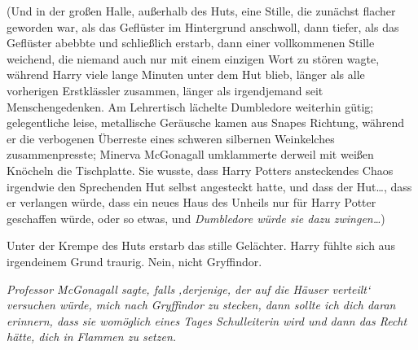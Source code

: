 (Und in der großen Halle, außerhalb des Huts, eine Stille, die zunächst flacher geworden war, als das Geflüster im Hintergrund anschwoll, dann tiefer, als das Geflüster abebbte und schließlich erstarb, dann einer vollkommenen Stille weichend, die niemand auch nur mit einem einzigen Wort zu stören wagte, während Harry viele lange Minuten unter dem Hut blieb, länger als alle vorherigen Erstklässler zusammen, länger als irgendjemand seit Menschengedenken. Am Lehrertisch lächelte Dumbledore weiterhin gütig; gelegentliche leise, metallische Geräusche kamen aus Snapes Richtung, während er die verbogenen Überreste eines schweren silbernen Weinkelches zusammenpresste; Minerva McGonagall umklammerte derweil mit weißen Knöcheln die Tischplatte. Sie wusste, dass Harry Potters ansteckendes Chaos irgendwie den Sprechenden Hut selbst angesteckt hatte, und dass der Hut…, dass er verlangen würde, dass ein neues Haus des Unheils nur für Harry Potter geschaffen würde, oder so etwas, und \emph{Dumbledore würde sie dazu zwingen…})

Unter der Krempe des Huts erstarb das stille Gelächter. Harry fühlte sich aus irgendeinem Grund traurig. Nein, nicht Gryffindor.

\emph{Professor McGonagall sagte, falls ‚derjenige, der auf die Häuser verteilt‘ versuchen würde, mich nach Gryffindor zu stecken, dann sollte ich dich daran erinnern, dass sie womöglich eines Tages Schulleiterin wird und dann das Recht hätte, dich in Flammen zu setzen. }

